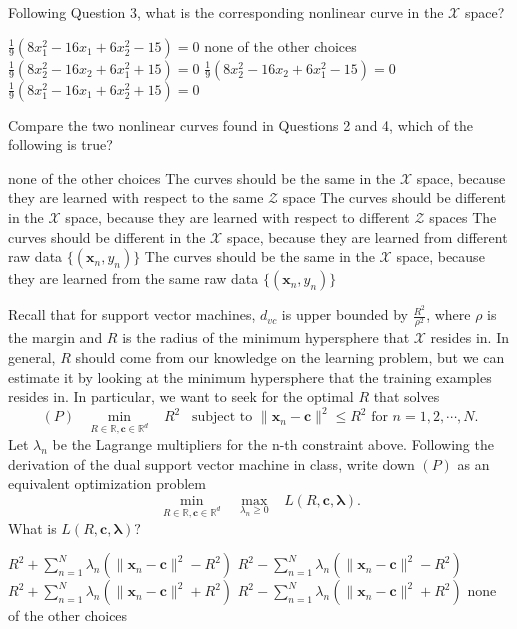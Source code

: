 \documentclass[a4paper,10pt]{exam}
\begin{document}
\begin{questions}
	 \question Following Question 3, what is the corresponding nonlinear curve in the $\mathcal{X}$ space?
	 \begin{choices}
	 	\CorrectChoice $\frac{1}{9}(8x_1^2-16x_1+6x_2^2 - 15) = 0$
	 	\choice none of the other choices
	 	\choice $\frac{1}{9}(8x_2^2-16x_2+6x_1^2 + 15) = 0$
	 	\choice $\frac{1}{9}(8x_2^2-16x_2+6x_1^2 - 15) = 0$
	 	\choice $\frac{1}{9}(8x_1^2-16x_1+6x_2^2 + 15) = 0$\\
	 \end{choices}
	 
	\question Compare the two nonlinear curves found in Questions 2 and 4, which of the following is true?
	\begin{choices}
		\choice none of the other choices
		\choice The curves should be the same in the $\mathcal{X}$ space, because they are learned with respect to the same $\mathcal{Z}$ space
		\CorrectChoice The curves should be different in the $\mathcal{X}$ space, because they are learned with respect to different $\mathcal{Z}$ spaces
		\choice The curves should be different in the $\mathcal{X}$ space, because they are learned from different raw data $\{(\mathbf{x}_n, y_n)\}$
		\choice The curves should be the same in the $\mathcal{X}$ space, because they are learned from the same raw data $\{(\mathbf{x}_n, y_n)\}$\\
	\end{choices}
	
	\question Recall that for support vector machines, $d_{vc}$ is upper bounded by $\frac{R^2}{\rho^2}$, where $\rho$ is the margin and $R$ is the radius of the minimum hypersphere that $\mathcal{X}$ resides in. In general, $R$ should come from our knowledge on the learning problem, but we can estimate it by looking at the minimum hypersphere that the training examples resides in. In particular, we want to seek for the optimal $R$ that solves \[(P) \; \; \; \min_{R \in \mathbb{R}, \mathbf{c} \in \mathbb{R}^d} \; \; \; R^2 \; \; \; \mbox{subject to } \|\mathbf{x}_n - \mathbf{c}\|^2 \le R^2 \mbox{ for } n = 1, 2, \cdots, N.\]
	Let $\lambda_n$ be the Lagrange multipliers for the n-th constraint above. Following the derivation of the dual support vector machine in class, write down $(P)$ as an equivalent optimization problem \[\min_{R \in \mathbb{R}, \mathbf{c} \in \mathbb{R}^d} \;\;\; \max_{\lambda_n \ge 0} \;\;\; L(R, \mathbf{c}, {\boldsymbol\lambda}).\] What is $L(R, \mathbf{c}, {\boldsymbol\lambda})?$
	
	\begin{choices}
		\CorrectChoice $R^2 + \sum_{n=1}^N \lambda_n( \|\mathbf{x}_n - \mathbf{c}\|^2 - R^2)$
		\choice $R^2 - \sum_{n=1}^N \lambda_n( \|\mathbf{x}_n - \mathbf{c}\|^2 - R^2)$
		\choice $R^2 + \sum_{n=1}^N \lambda_n( \|\mathbf{x}_n - \mathbf{c}\|^2 + R^2)$
		\choice $R^2 - \sum_{n=1}^N \lambda_n( \|\mathbf{x}_n - \mathbf{c}\|^2 + R^2)$
		\choice none of the other choices\\
	\end{choices}
	

\end{questions}
\end{document}
